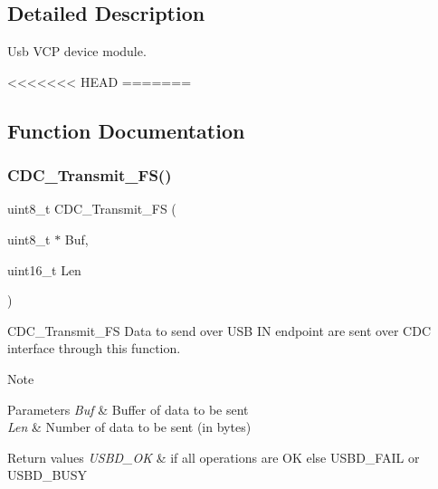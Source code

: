 \subsection{Detailed Description}
Usb V\+CP device module. 

<<<<<<< HEAD
=======


\subsection{Function Documentation}
\mbox{\label{group___u_s_b_d___c_d_c___i_f_ga5137d6201dbdef2bf351c5b4941c24f4}} 
\subsubsection{\texorpdfstring{C\+D\+C\+\_\+\+Transmit\+\_\+\+F\+S()}{CDC\_Transmit\_FS()}}
{\footnotesize\ttfamily uint8\+\_\+t C\+D\+C\+\_\+\+Transmit\+\_\+\+FS (\begin{DoxyParamCaption}\item[{uint8\+\_\+t $\ast$}]{Buf,  }\item[{uint16\+\_\+t}]{Len }\end{DoxyParamCaption})}



C\+D\+C\+\_\+\+Transmit\+\_\+\+FS Data to send over U\+SB IN endpoint are sent over C\+DC interface through this function. 

\begin{DoxyNote}{Note}

\end{DoxyNote}

\begin{DoxyParams}{Parameters}
{\em Buf} & Buffer of data to be sent \\
\hline
{\em Len} & Number of data to be sent (in bytes) \\
\hline
\end{DoxyParams}

\begin{DoxyRetVals}{Return values}
{\em U\+S\+B\+D\+\_\+\+OK} & if all operations are OK else U\+S\+B\+D\+\_\+\+F\+A\+IL or U\+S\+B\+D\+\_\+\+B\+U\+SY \\
\hline
\end{DoxyRetVals}
\mbox{\label{group___u_s_b_d___c_d_c___i_f_ga2e774589b6717992afd2b46280dabb8c}} 
